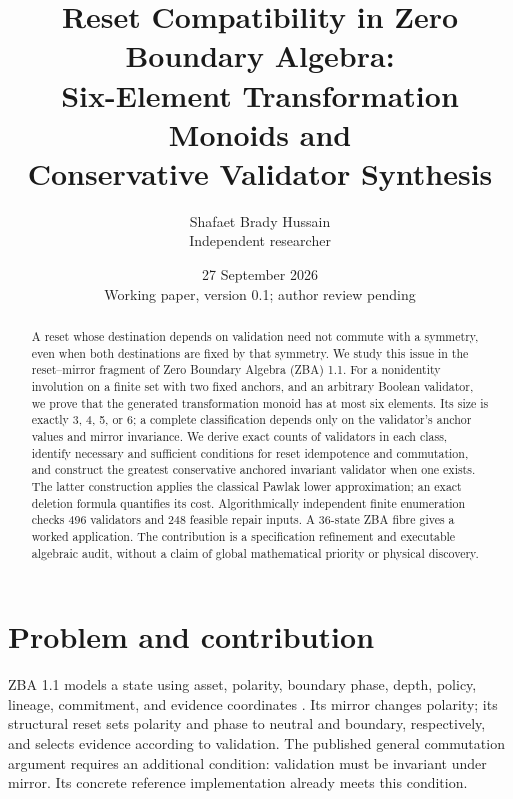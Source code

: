 \documentclass[11pt,a4paper]{article}
\title{Reset Compatibility in Zero Boundary Algebra:\\Six-Element Transformation Monoids and\\Conservative Validator Synthesis}
\author{Shafaet Brady Hussain\\Independent researcher}
\date{27 September 2026\\\small Working paper, version 0.1; author review pending}
\begin{document}
\maketitle
\begin{abstract}
A reset whose destination depends on validation need not commute with a symmetry, even when both destinations are fixed by that symmetry. We study this issue in the reset--mirror fragment of Zero Boundary Algebra (ZBA) 1.1. For a nonidentity involution on a finite set with two fixed anchors, and an arbitrary Boolean validator, we prove that the generated transformation monoid has at most six elements. Its size is exactly 3, 4, 5, or 6; a complete classification depends only on the validator's anchor values and mirror invariance. We derive exact counts of validators in each class, identify necessary and sufficient conditions for reset idempotence and commutation, and construct the greatest conservative anchored invariant validator when one exists. The latter construction applies the classical Pawlak lower approximation; an exact deletion formula quantifies its cost. Algorithmically independent finite enumeration checks 496 validators and 248 feasible repair inputs. A 36-state ZBA fibre gives a worked application. The contribution is a specification refinement and executable algebraic audit, without a claim of global mathematical priority or physical discovery.
\end{abstract}
\section{Problem and contribution}
ZBA 1.1 models a state using asset, polarity, boundary phase, depth, policy, lineage, commitment, and evidence coordinates \cite{zba}. Its mirror changes polarity; its structural reset sets polarity and phase to neutral and boundary, respectively, and selects evidence according to validation. The published general commutation argument requires an additional condition: validation must be invariant under mirror. Its concrete reference implementation already meets this condition.
\end{document}

